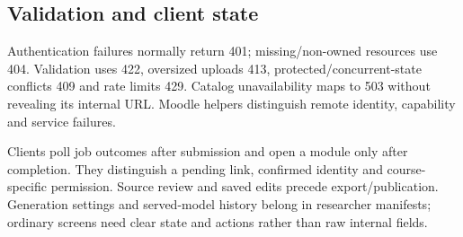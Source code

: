 \subsection{Validation and client state}
Authentication failures normally return 401; missing/non-owned resources use 404. Validation uses 422, oversized uploads 413, protected/concurrent-state conflicts 409 and rate limits 429. Catalog unavailability maps to 503 without revealing its internal URL. Moodle helpers distinguish remote identity, capability and service failures.

Clients poll job outcomes after submission and open a module only after completion. They distinguish a pending link, confirmed identity and course-specific permission. Source review and saved edits precede export/publication. Generation settings and served-model history belong in researcher manifests; ordinary screens need clear state and actions rather than raw internal fields.
